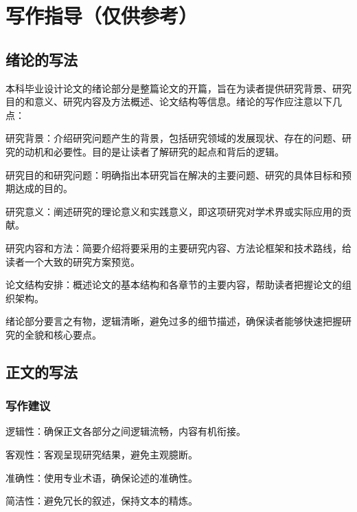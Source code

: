 \setcounter{page}{1}        %

\chapter{写作指导（仅供参考）}              %
\section{绪论的写法}     %

本科毕业设计论文的绪论部分是整篇论文的开篇，旨在为读者提供研究背景、研究目的和意义、研究内容及方法概述、论文结构等信息。绪论的写作应注意以下几点：

研究背景：介绍研究问题产生的背景，包括研究领域的发展现状、存在的问题、研究的动机和必要性。目的是让读者了解研究的起点和背后的逻辑。

研究目的和研究问题：明确指出本研究旨在解决的主要问题、研究的具体目标和预期达成的目的。

研究意义：阐述研究的理论意义和实践意义，即这项研究对学术界或实际应用的贡献。

研究内容和方法：简要介绍将要采用的主要研究内容、方法论框架和技术路线，给读者一个大致的研究方案预览。

论文结构安排：概述论文的基本结构和各章节的主要内容，帮助读者把握论文的组织架构。

绪论部分要言之有物，逻辑清晰，避免过多的细节描述，确保读者能够快速把握研究的全貌和核心要点。

\section{正文的写法}    %

\subsection{写作建议}   %

逻辑性：确保正文各部分之间逻辑流畅，内容有机衔接。

客观性：客观呈现研究结果，避免主观臆断。

准确性：使用专业术语，确保论述的准确性。

简洁性：避免冗长的叙述，保持文本的精炼。
